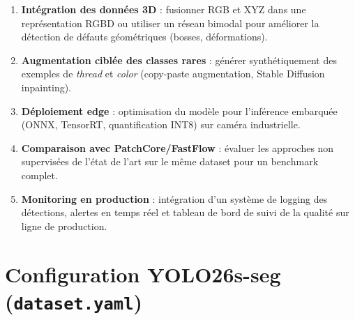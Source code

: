 \documentclass[12pt, a4paper]{report}
\begin{document}
\begin{enumerate}
  \item \textbf{Intégration des données 3D} : fusionner RGB et XYZ dans une représentation RGBD ou utiliser un réseau bimodal pour améliorer la détection de défauts géométriques (bosses, déformations).
  \item \textbf{Augmentation ciblée des classes rares} : générer synthétiquement des exemples de \textit{thread} et \textit{color} (copy-paste augmentation, Stable Diffusion inpainting).
  \item \textbf{Déploiement edge} : optimisation du modèle pour l'inférence embarquée (ONNX, TensorRT, quantification INT8) sur caméra industrielle.
  \item \textbf{Comparaison avec PatchCore/FastFlow} : évaluer les approches non supervisées de l'état de l'art sur le même dataset pour un benchmark complet.
  \item \textbf{Monitoring en production} : intégration d'un système de logging des détections, alertes en temps réel et tableau de bord de suivi de la qualité sur ligne de production.
\end{enumerate}

\newpage

\printbibliography[heading=bibintoc, title={Références Bibliographiques}]


\appendix
\chapter{Configuration YOLO26s-seg (\texttt{dataset.yaml})}
\end{document}
